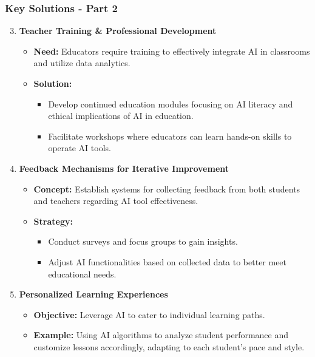 \documentclass[aspectratio=169]{beamer}
\begin{document}
\begin{frame}[fragile]
    \frametitle{Key Solutions - Part 2}
    \begin{enumerate}
        \setcounter{enumi}{2} %
        \item \textbf{Teacher Training \& Professional Development}
            \begin{itemize}
                \item \textbf{Need:} Educators require training to effectively integrate AI in classrooms and utilize data analytics.
                \item \textbf{Solution:}
                    \begin{itemize}
                        \item Develop continued education modules focusing on AI literacy and ethical implications of AI in education.
                        \item Facilitate workshops where educators can learn hands-on skills to operate AI tools.
                    \end{itemize}
            \end{itemize}
        \item \textbf{Feedback Mechanisms for Iterative Improvement}
            \begin{itemize}
                \item \textbf{Concept:} Establish systems for collecting feedback from both students and teachers regarding AI tool effectiveness.
                \item \textbf{Strategy:}
                    \begin{itemize}
                        \item Conduct surveys and focus groups to gain insights.
                        \item Adjust AI functionalities based on collected data to better meet educational needs.
                    \end{itemize}
            \end{itemize}
        \item \textbf{Personalized Learning Experiences}
            \begin{itemize}
                \item \textbf{Objective:} Leverage AI to cater to individual learning paths.
                \item \textbf{Example:} Using AI algorithms to analyze student performance and customize lessons accordingly, adapting to each student's pace and style.
            \end{itemize}
    \end{enumerate}
\end{frame}
\end{document}
